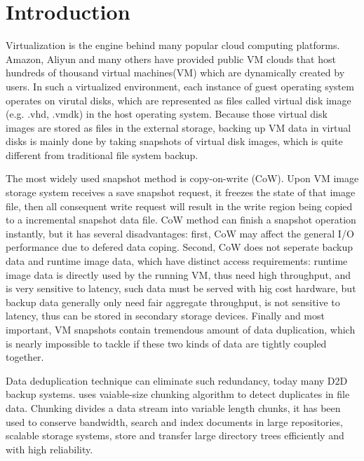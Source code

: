 \section{Introduction}


Virtualization is the engine behind many popular cloud computing platforms.
Amazon, Aliyun and many others have provided public VM clouds that host 
hundreds of thousand virtual machines(VM) which are dynamically created
by users. In such a virtualized environment,
each instance of guest operating system operates
on virutal disks, which are represented as
files called virtual disk image (e.g. .vhd, .vmdk) in the host operating system.
Because those virtual disk images are stored as files in the external storage,
backing up VM data in virtual disks is mainly done by taking snapshots
of virtual disk images,
which is quite different from traditional file system backup. 

The most widely used snapshot method is copy-on-write (CoW). Upon VM image storage system receives a save snapshot request,
it freezes the state of that image file, then all consequent write request will result in the write region being copied
to a incremental snapshot data file. CoW method can finish a snapshot operation instantly, but it has several disadvantages:
first, CoW may affect the general I/O performance due to defered data coping. 
Second, CoW does not seperate backup data and runtime image data,
which have distinct access requirements: runtime image data is directly used by the running VM, 
thus need high throughput, and is very sensitive to latency,
such data must be served with hig cost hardware, but backup data generally only need fair aggregate throughput, 
is not sensitive to latency, thus can be stored in secondary storage devices.
Finally and most important, VM snapshots contain tremendous amount of data duplication, which is nearly impossible to tackle 
if these two kinds of data are tightly coupled together.
 
Data deduplication technique can eliminate such redundancy,
today many D2D backup systems\cite{emc_avamar}\cite{datadomain_whitepaper}.
uses vaiable-size chunking algorithm to detect duplicates in file data.
Chunking divides a data stream into variable length chunks, it has been used to conserve bandwidth\cite{lbfs01}, 
search and index documents in large repositories\cite{bhag07}, scalable storage systems\cite{hydrastor09}, 
store and transfer large directory trees efficiently and with high reliability\cite{jumbo07}.

